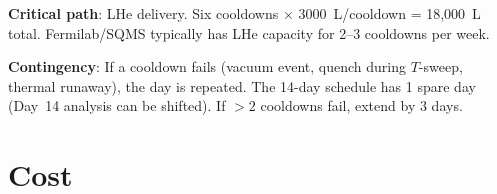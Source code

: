 \documentclass[11pt]{article}
\theoremstyle{definition}
\theoremstyle{remark}
\begin{document}
\begin{tcolorbox}[colback=white, colframe=black,
  title=\textbf{14-DAY CAMPAIGN SCHEDULE}, breakable]
\begin{longtable}{@{}clp{8cm}@{}}
\bottomrule
\end{longtable}

\textbf{Critical path}: LHe delivery. Six cooldowns $\times$
3000~L/cooldown = 18,000~L total. Fermilab/SQMS typically has
LHe capacity for 2--3 cooldowns per week.

\textbf{Contingency}: If a cooldown fails (vacuum event, quench
during $T$-sweep, thermal runaway), the day is repeated. The 14-day
schedule has 1 spare day (Day~14 analysis can be shifted). If $> 2$
cooldowns fail, extend by 3 days.

\end{tcolorbox}


\part{Cost}
\label{sec:cost}
\end{document}
